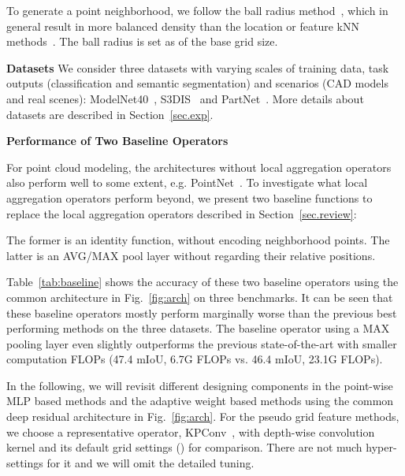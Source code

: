 \documentclass[runningheads]{llncs}
\begin{document}
To generate a point neighborhood, we follow the ball radius method~\cite{qi2017pointnet++,Hermosilla_2018,liu2019rscnn}, which in general result in more balanced density than the location or feature kNN methods~\cite{wang2018paramconv,Atzmon_2018,wang2019dynamic}. The ball radius is set as  of the base grid size.

\vspace{0.3em} \noindent \textbf{Datasets} We consider three datasets with varying scales of training data, task outputs (classification and semantic segmentation) and scenarios (CAD models and real scenes): ModelNet40~\cite{wu20153d}, S3DIS~\cite{2017arXiv170201105A} and PartNet~\cite{mo2019partnet}. More details about datasets are described in Section~\ref{sec.exp}.

\vspace{0.3em} \noindent \textbf{Performance of Two Baseline Operators}

For point cloud modeling, the architectures without local aggregation operators also perform well to some extent, e.g. PointNet~\cite{qi2017pointnet}. To investigate what local aggregation operators perform beyond, we present two baseline functions to replace the local aggregation operators described in Section~\ref{sec.review}:
\begin{small}

\end{small}The former is an identity function, without encoding neighborhood points. The latter is an AVG/MAX pool layer without regarding their relative positions.

Table~\ref{tab:baseline} shows the accuracy of these two baseline operators using the common architecture in Fig.~\ref{fig:arch} on three benchmarks. It can be seen that these baseline operators mostly perform marginally worse than the previous best performing methods on the three datasets. The baseline operator using a MAX pooling layer even slightly outperforms the previous state-of-the-art with smaller computation FLOPs (47.4 mIoU, 6.7G FLOPs vs. 46.4 mIoU, 23.1G FLOPs).

In the following, we will revisit different designing components in the point-wise MLP based methods and the adaptive weight based methods using the common deep residual architecture in Fig.~\ref{fig:arch}. For the pseudo grid feature methods, we choose a representative operator, KPConv~\cite{thomas2019kpconv}, with depth-wise convolution kernel and its default grid settings () for comparison. There are not much hyper-settings for it and we will omit the detailed tuning.
\end{document}
